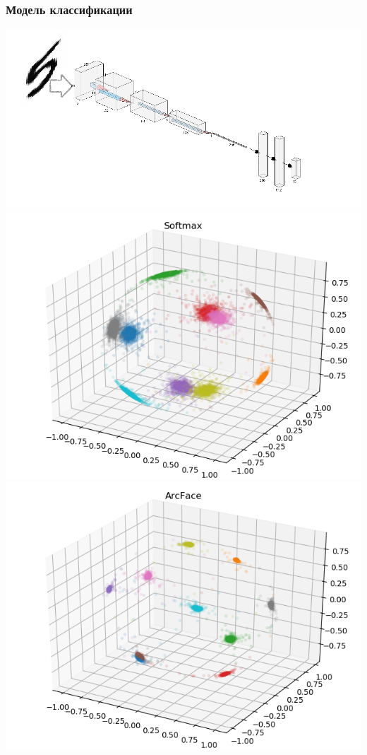 \documentclass{beamer}
\begin{document}
\begin{frame}
\frametitle{Модель классификации}
\includegraphics[scale=0.3]{mnist_model.png}
\includegraphics[scale=0.3]{mnist_vgg8_3d.png}
\includegraphics[scale=0.3]{mnist_vgg8_arcface_3d.png}
\end{frame}
\end{document}
